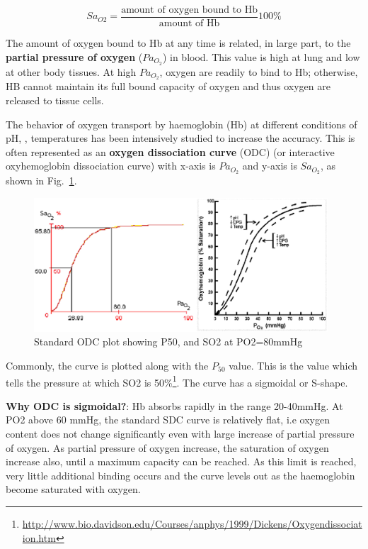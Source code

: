 \begin{equation}
  \label{eq:304}
  Sa_{O2} = \frac{\text{amount of oxygen bound to Hb}}{\text{amount
      of Hb}} 100\%
\end{equation}


The amount of oxygen bound to Hb at any time is related, in large
part, to the {\bf partial pressure of oxygen} ($Pa_{O_2}$) in
blood. This value is high at lung and low at other body tissues. At
high $Pa_{O_2}$, oxygen are readily to bind to Hb; otherwise, HB cannot
maintain its full bound capacity of oxygen and thus oxygen are
released to tissue cells.

The behavior of oxygen transport by haemoglobin (Hb) at different
conditions of pH, , temperatures has been intensively studied
to increase the accuracy.  This is often represented as an
{\bf oxygen dissociation curve} (ODC) (or interactive oxyhemoglobin
dissociation curve) with x-axis is $Pa_{O_2}$ and y-axis is $Sa_{O_2}$, as
shown in Fig.~\ref{fig:SDC_plot}. 

\begin{figure}[hbt]
  \centerline{\includegraphics[height=5cm]{./images/PO2_SO2_plot.eps}}
  \caption{Standard ODC plot showing P50, and SO2 at PO2=80mmHg}
  \label{fig:SDC_plot}
\end{figure}

Commonly, the curve is plotted along with the $P_{50}$ value. This is
the value which tells the pressure at which SO2 is
50\%\footnote{\url{http://www.bio.davidson.edu/Courses/anphys/1999/Dickens/Oxygendissociation.htm}}.
The curve has a sigmoidal or S-shape. 

{\bf Why ODC is sigmoidal?}: Hb absorbs  rapidly in the range
20-40mmHg. At PO2 above 60 mmHg, the standard SDC curve is relatively
flat, i.e oxygen content does not change significantly even with large
increase of partial pressure of oxygen.  As partial pressure of oxygen
increase, the saturation of oxygen increase also, until a maximum
capacity can be reached. As this limit is reached, very little
additional binding occurs and the curve levels out as the haemoglobin
become saturated with oxygen.

